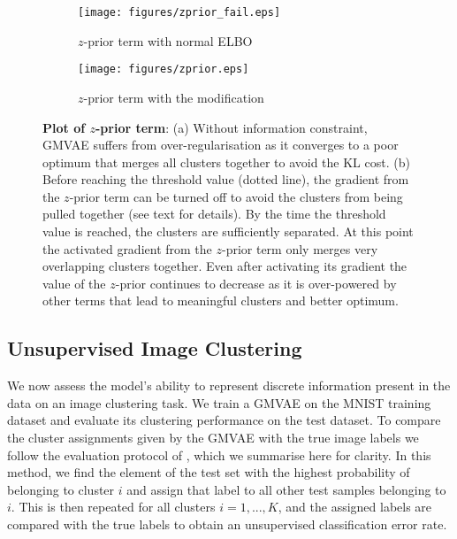 \documentclass{article} \usepackage{iclr2017_conference,times}
\begin{document}
\begin{figure}[h]
\centering
\begin{subfigure}{.5\textwidth}
		\centering
		\texttt{[image: figures/zprior\_fail.eps]}
		\caption{$z$-prior term with normal ELBO}
        \label{fig:zpriorfail}
	\end{subfigure}\begin{subfigure}{.5\textwidth}
		\centering
		\texttt{[image: figures/zprior.eps]}
		\caption{$z$-prior term with the modification}
        \label{fig:zprior}
	\end{subfigure}

\caption{\textbf{Plot of $z$-prior term}: (a) Without information constraint, GMVAE suffers from over-regularisation as it converges to a poor optimum that merges all clusters together to avoid the KL cost. (b) Before reaching the threshold value (dotted line), the gradient from the $z$-prior term can be turned off to avoid the clusters from being pulled together (see text for details). By the time the threshold value is reached, the clusters are sufficiently separated. At this point the activated gradient from the $z$-prior term only merges very overlapping clusters together. Even after activating its gradient the value of the $z$-prior continues to decrease as it is over-powered by other terms that lead to meaningful clusters and better optimum.}
\label{fig:zplot}
\end{figure}

\subsection{Unsupervised Image Clustering}

We now assess the model's ability to represent discrete information present in the data on an image clustering task. We train a GMVAE on the MNIST training dataset and evaluate its clustering performance on the test dataset. To compare the cluster assignments given by the GMVAE with the true image labels we follow the evaluation protocol of \cite{makhzani2015adversarial}, which we summarise here for clarity. In this method, we find the element of the test set with the highest probability of belonging to cluster $i$ and assign that label to all other test samples belonging to $i$. This is then repeated for all clusters $i = 1, ..., K$, and the assigned labels are compared with the true labels to obtain an unsupervised classification error rate.
\end{document}
